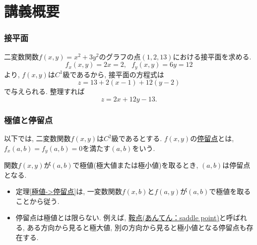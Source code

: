 
\section{講義概要}

\begin{frame}
\frametitle{接平面}

二変数関数$f(x,y)=x^2+3y^2$のグラフの点$(1,2,13)$における接平面を求める. 
$$
f_x(x,y)=2x=2, \ \ \ f_y(x,y)=6y=12
$$
より, $f(x,y)$は$C^1$級であるから, 接平面の方程式は
$$
z=13+2(x-1)+12(y-2)
$$
で与えられる. 整理すれば
$$
z=2x+12y-13. 
$$

\end{frame}




\begin{frame}
\frametitle{極値と停留点}

以下では, 二変数関数$f(x,y)$は$C^2$級であるとする. 
$f(x,y)$の\underline{停留点}とは, $f_x(a,b) = f_y(a,b) = 0$を満たす$(a,b)$をいう. 

\begin{Thm} \label{極値->停留点}
関数$f(x,y)$が$(a,b)$で極値(極大値または極小値)を取るとき, $(a,b)$は停留点となる. 
\end{Thm}

\begin{itemize}
\item 定理\ref{極値->停留点}は, 一変数関数$f(x,b)$と$f(a,y)$が$(a,b)$で極値を取ることから従う. 
\item 停留点は極値とは限らない. 例えば, \underline{鞍点(あんてん：saddle point)}と呼ばれる, ある方向から見ると極大値, 別の方向から見ると極小値となる停留点も存在する. 
\end{itemize}

\end{frame}






